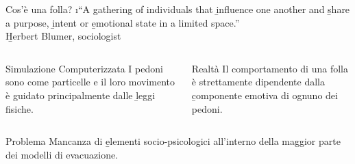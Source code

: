 \begin{block}{Cos'è una folla?}
    \raggedleft
    \i{``A gathering of individuals that \b{influence one another} and \b{share a purpose}, \b{intent} or \b{emotional state} in a limited space.''}\\
    \vspace{1mm}
    \b{Herbert Blumer, sociologist}
\end{block}

\begin{columns}[T]
    \begin{column}{0.48\textwidth}
        \begin{block}{Simulazione Computerizzata}
            I pedoni sono come particelle e il loro movimento è guidato principalmente dalle \b{leggi fisiche}. 
        \end{block}
    \end{column}

    \begin{column}{0.48\textwidth}
        \begin{block}{Realtà}
            Il comportamento di una folla è strettamente dipendente dalla \b{componente emotiva} di ognuno dei pedoni.
        \end{block}
    \end{column}
\end{columns}

\begin{alertblock}{Problema}
    Mancanza di \b{elementi socio-psicologici} all'interno della maggior parte dei modelli di evacuazione.
\end{alertblock}